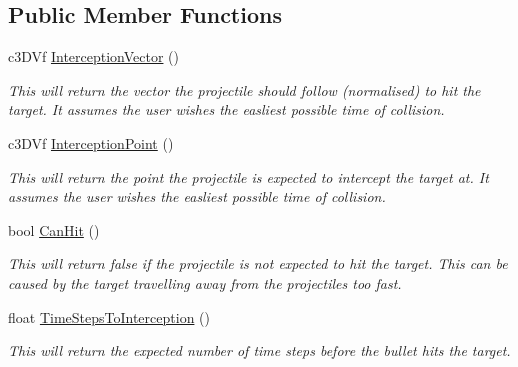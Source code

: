\subsection*{Public Member Functions}
\begin{DoxyCompactItemize}
\item 
\hypertarget{classc_predictive_aiming_adbf2a7d9cdc8c3cbfa7c2e070aa37961}{
c3DVf \hyperlink{classc_predictive_aiming_adbf2a7d9cdc8c3cbfa7c2e070aa37961}{InterceptionVector} ()}
\label{classc_predictive_aiming_adbf2a7d9cdc8c3cbfa7c2e070aa37961}

\begin{DoxyCompactList}\small\item\em This will return the vector the projectile should follow (normalised) to hit the target. It assumes the user wishes the easliest possible time of collision. \end{DoxyCompactList}\item 
\hypertarget{classc_predictive_aiming_ae9d0022b23f22e71196d801b9191f1f9}{
c3DVf \hyperlink{classc_predictive_aiming_ae9d0022b23f22e71196d801b9191f1f9}{InterceptionPoint} ()}
\label{classc_predictive_aiming_ae9d0022b23f22e71196d801b9191f1f9}

\begin{DoxyCompactList}\small\item\em This will return the point the projectile is expected to intercept the target at. It assumes the user wishes the easliest possible time of collision. \end{DoxyCompactList}\item 
\hypertarget{classc_predictive_aiming_a45ecd9805c7f3f56baea85144528ea1c}{
bool \hyperlink{classc_predictive_aiming_a45ecd9805c7f3f56baea85144528ea1c}{CanHit} ()}
\label{classc_predictive_aiming_a45ecd9805c7f3f56baea85144528ea1c}

\begin{DoxyCompactList}\small\item\em This will return false if the projectile is not expected to hit the target. This can be caused by the target travelling away from the projectiles too fast. \end{DoxyCompactList}\item 
\hypertarget{classc_predictive_aiming_af643b09f28056da9e930fe61f5774103}{
float \hyperlink{classc_predictive_aiming_af643b09f28056da9e930fe61f5774103}{TimeStepsToInterception} ()}
\label{classc_predictive_aiming_af643b09f28056da9e930fe61f5774103}

\begin{DoxyCompactList}\small\item\em This will return the expected number of time steps before the bullet hits the target. \end{DoxyCompactList}\end{DoxyCompactItemize}



